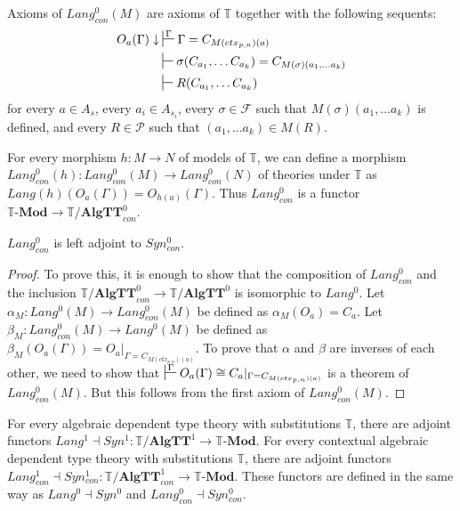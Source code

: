 \documentclass[reqno]{amsart}
\theoremstyle{definition}
\theoremstyle{remark}
\newcommand{\cat}[1]{\mathbf{#1}}
\newcommand{\Mod}[1]{#1\text{-}\cat{Mod}}
\newcommand{\algtt}{\cat{AlgTT}}
\numberwithin{figure}{section}
\begin{document}
Axioms of $Lang^0_{con}(M)$ are axioms of $\mathbb{T}$ together with the following sequents:
\begin{align*}
O_a(\Gamma) \downarrow & \sststile{}{\Gamma} \Gamma = C_{M(ctx_{p,n})(a)}\\
& \sststile{}{} \sigma(C_{a_1}, \ldots C_{a_k}) = C_{M(\sigma)(a_1, \ldots a_k)} \\
& \sststile{}{} R(C_{a_1}, \ldots C_{a_k})
\end{align*}
for every $a \in A_s$, every $a_i \in A_{s_i}$,
every $\sigma \in \mathcal{F}$ such that $M(\sigma)(a_1, \ldots a_k)$ is defined,
and every $R \in \mathcal{P}$ such that $(a_1, \ldots a_k) \in M(R)$.

For every morphism $h : M \to N$ of models of $\mathbb{T}$, we can define a morphism $Lang^0_{con}(h) : Lang^0_{con}(M) \to Lang^0_{con}(N)$ of theories under $\mathbb{T}$ as $Lang(h)(O_a(\Gamma)) = O_{h(a)}(\Gamma)$.
Thus $Lang^0_{con}$ is a functor $\Mod{\mathbb{T}} \to \mathbb{T}/\algtt^0_{con}$.

\begin{prop}
$Lang^0_{con}$ is left adjoint to $Syn^0_{con}$.
\end{prop}
\begin{proof}
To prove this, it is enough to show that the composition of $Lang^0_{con}$ and the inclusion $\mathbb{T}/\algtt^0_{con} \to \mathbb{T}/\algtt^0$ is isomorphic to $Lang^0$.
Let $\alpha_M : Lang^0(M) \to Lang^0_{con}(M)$ be defined as $\alpha_M(O_a) = C_a$.
Let $\beta_M : Lang^0_{con}(M) \to Lang^0(M)$ be defined as $\beta_M(O_a(\Gamma)) = O_a|_{\Gamma = C_{M(ctx_{p,n})(a)}}$.
To prove that $\alpha$ and $\beta$ are inverses of each other, we need to show that $\sststile{}{\Gamma} O_a(\Gamma) \cong C_a|_{\Gamma = C_{M(ctx_{p,n})(a)}}$ is a theorem of $Lang^0_{con}(M)$.
But this follows from the first axiom of $Lang^0_{con}(M)$.
\end{proof}

For every algebraic dependent type theory with substitutions $\mathbb{T}$, there are adjoint functors $Lang^1 \dashv Syn^1 : \mathbb{T}/\algtt^1 \to \Mod{\mathbb{T}}$.
For every contextual algebraic dependent type theory with substitutions $\mathbb{T}$, there are adjoint functors $Lang^1_{con} \dashv Syn^1_{con} : \mathbb{T}/\algtt^1_{con} \to \Mod{\mathbb{T}}$.
These functors are defined in the same way as $Lang^0 \dashv Syn^0$ and $Lang^0_{con} \dashv Syn^0_{con}$.



\end{document}
